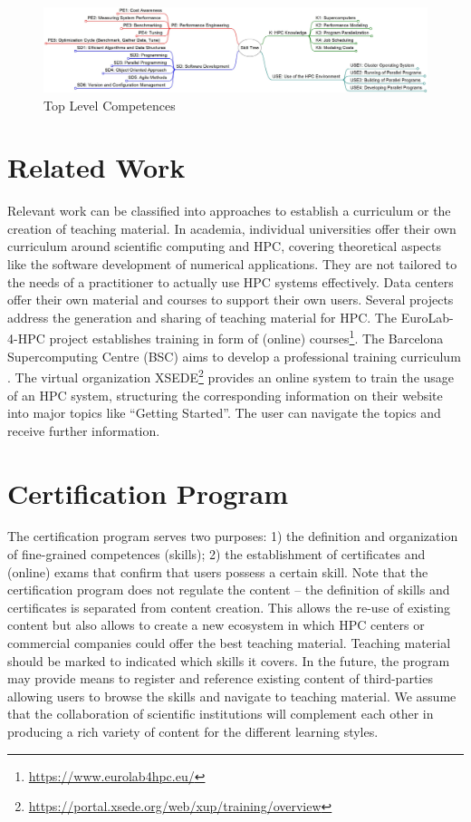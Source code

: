 \documentclass[jocse]{jocseart}
\newcommand{\jk}[1]{\todo[inline]{TODO: #1}}
\begin{document}
\begin{figure}[tb!]
	\centering
	\includegraphics[width=15.0cm]{skill-tree_top_levels.jpg}
  \vspace*{-2em}
	\caption{Top Level Competences}
	\label{f_top_level_competences}
\end{figure}

\section{Related Work}
\jk{Please everyone!}

Relevant work can be classified into approaches to establish a curriculum or the creation of teaching material.
In academia, individual universities offer their own curriculum around scientific computing and HPC, covering theoretical aspects like the software development of numerical applications.
They are not tailored to the needs of a practitioner to actually use HPC systems effectively.
Data centers offer their own material and courses to support their own users.
Several projects address the generation and sharing of teaching material for HPC.
The EuroLab-4-HPC project establishes training in form of (online) courses\footnote{\url{https://www.eurolab4hpc.eu/}}.
The Barcelona Supercomputing Centre (BSC) aims to develop a professional training curriculum \cite{sancho2016bsc}.
The virtual organization XSEDE\footnote{\url{https://portal.xsede.org/web/xup/training/overview}} provides an online system to train the usage of an HPC system, structuring the corresponding information on their website into major topics like “Getting Started”.
The user can navigate the topics and receive further information.






\section{Certification Program}

The certification program serves two purposes:
1) the definition and organization of fine-grained competences (skills);
2) the establishment of certificates and (online) exams that confirm that users possess a certain skill.
Note that the certification program does not regulate the content -- the definition of skills and certificates is separated from content creation.
This allows the re-use of existing content but also allows to create a new ecosystem in which HPC centers or commercial companies could offer the best teaching material.
Teaching material should be marked to indicated which skills it covers.
In the future, the program may provide means to register and reference existing content of third-parties allowing users to browse the skills and navigate to teaching material.
We assume that the collaboration of scientific institutions will complement each other in producing a rich variety of content for the different learning styles.
\end{document}
